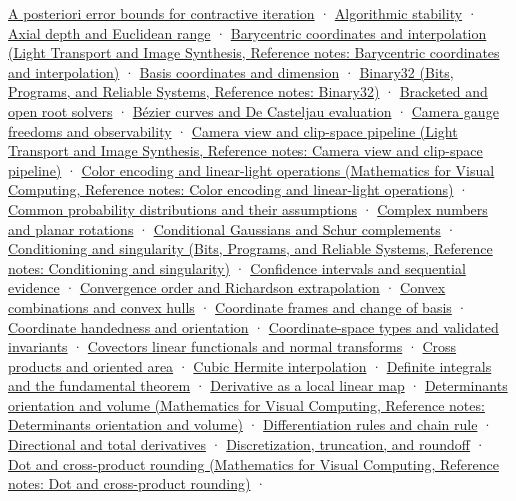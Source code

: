 \hyperref[appendix-d83b0ad1be7f]{A posteriori error bounds for contractive iteration} · \hyperref[appendix-aa2bf0d79639]{Algorithmic stability} · \hyperref[appendix-cac01ebeeb11]{Axial depth and Euclidean range} · \href{../04-Light-Transport-and-Image-Synthesis/main.pdf\#nameddest=appendix-02b9d9a81dca}{Barycentric coordinates and interpolation (Light Transport and Image Synthesis, Reference notes: Barycentric coordinates and interpolation)} · \hyperref[appendix-ce0341f7ea0d]{Basis coordinates and dimension} · \href{../01-Bits-Programs-and-Reliable-Systems/main.pdf\#nameddest=appendix-5057f9ad327f}{Binary32 (Bits, Programs, and Reliable Systems, Reference notes: Binary32)} · \hyperref[appendix-f63eb850796d]{Bracketed and open root solvers} · \hyperref[appendix-ddbec701898c]{Bézier curves and De Casteljau evaluation} · \hyperref[appendix-113f0267e5f4]{Camera gauge freedoms and observability} · \href{../04-Light-Transport-and-Image-Synthesis/main.pdf\#nameddest=appendix-1c07d64f5e70}{Camera view and clip-space pipeline (Light Transport and Image Synthesis, Reference notes: Camera view and clip-space pipeline)} · \href{../02-Mathematics-for-Visual-Computing/main.pdf\#nameddest=appendix-a9f83ad40792}{Color encoding and linear-light operations (Mathematics for Visual Computing, Reference notes: Color encoding and linear-light operations)} · \hyperref[appendix-a2360b435383]{Common probability distributions and their assumptions} · \hyperref[appendix-f77eadcc4a93]{Complex numbers and planar rotations} · \hyperref[appendix-f0437ea55a47]{Conditional Gaussians and Schur complements} · \href{../01-Bits-Programs-and-Reliable-Systems/main.pdf\#nameddest=appendix-8f6a01f284a7}{Conditioning and singularity (Bits, Programs, and Reliable Systems, Reference notes: Conditioning and singularity)} · \hyperref[appendix-c83016554b1e]{Confidence intervals and sequential evidence} · \hyperref[appendix-aca80b6bf17a]{Convergence order and Richardson extrapolation} · \hyperref[appendix-0026ec42c9d5]{Convex combinations and convex hulls} · \hyperref[appendix-1bae9457dbc3]{Coordinate frames and change of basis} · \hyperref[appendix-87d7626c8d37]{Coordinate handedness and orientation} · \hyperref[appendix-380a220e2529]{Coordinate-space types and validated invariants} · \hyperref[appendix-46da295c6787]{Covectors linear functionals and normal transforms} · \hyperref[appendix-2391db8052b1]{Cross products and oriented area} · \hyperref[appendix-db3aef8f2fd6]{Cubic Hermite interpolation} · \hyperref[appendix-1a50e72435c2]{Definite integrals and the fundamental theorem} · \hyperref[appendix-7bc181935c42]{Derivative as a local linear map} · \href{../02-Mathematics-for-Visual-Computing/main.pdf\#nameddest=appendix-da478be01d02}{Determinants orientation and volume (Mathematics for Visual Computing, Reference notes: Determinants orientation and volume)} · \hyperref[appendix-d9f70bdfbc92]{Differentiation rules and chain rule} · \hyperref[appendix-e2d476574aab]{Directional and total derivatives} · \hyperref[appendix-6b0648b2b8e8]{Discretization, truncation, and roundoff} · \href{../02-Mathematics-for-Visual-Computing/main.pdf\#nameddest=appendix-5aef4f13483a}{Dot and cross-product rounding (Mathematics for Visual Computing, Reference notes: Dot and cross-product rounding)} · 
